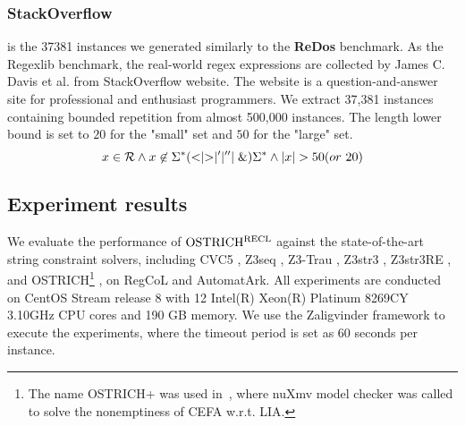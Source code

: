 {\subsubsection{StackOverflow} is the 37381 instances we generated similarly to the \textbf{ReDos} benchmark. As the Regexlib benchmark, the real-world regex expressions are collected by James C. Davis et al.\cite{regex_lingua_franca} from StackOverflow website\cite{stackoverflow}. The website is a question-and-answer site for professional and enthusiast programmers. We extract 37,381 instances containing bounded repetition from almost 500,000 instances. The length lower bound is set to $20$ for the "small" set and $50$ for the "large" set.
\begin{equation} \label{eq:template}
  x\in \mathcal{R} \wedge x\not\in \Sigma^*(<\mid >\mid '\mid ''\mid \&)\Sigma^*\wedge |x| > 50(or \ 20)
\end{equation}
}

\vspace{-3mm}
\subsection{Experiment results}

We evaluate the performance of $\rm OSTRICH^{RECL}$ against the state-of-the-art string constraint solvers, including CVC5 
\cite{cvc5}, Z3seq \cite{z3seq}, Z3-Trau 
\cite{z3trau}, Z3str3
\cite{z3str3}, Z3str3RE \cite{z3str3re}, and OSTRICH\footnote{The name OSTRICH+ was used in~\cite{atva2020}, where nuXmv model checker was called to solve the nonemptiness of CEFA w.r.t. LIA. } 
\cite{atva2020}, on RegCoL and AutomatArk. All experiments are conducted on CentOS Stream release 8 with 12 Intel(R) Xeon(R) Platinum 8269CY 3.10GHz CPU cores and 190 GB memory. We use the Zaligvinder framework \cite{zaligvinder_2021} to execute the experiments, where the timeout period is set as 60 seconds per instance. 

%


